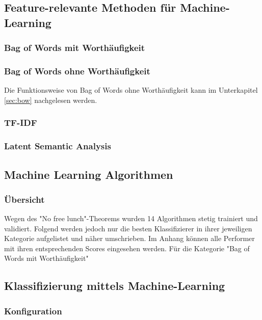 \subsection{Feature-relevante Methoden für Machine-Learning}
\subsubsection{Bag of Words mit Worthäufigkeit}
\subsubsection{Bag of Words ohne Worthäufigkeit}
Die Funktionsweise von Bag of Words ohne Worthäufigkeit kann im Unterkapitel \ref{sec:bow} nachgelesen werden.
\subsubsection{TF-IDF}
\subsubsection{Latent Semantic Analysis}
\subsection{Machine Learning Algorithmen}
\subsubsection{Übersicht}
Wegen des "No free lunch"-Theorems wurden 14 Algorithmen stetig trainiert und validiert.
Folgend werden jedoch nur die besten Klassifizierer in ihrer jeweiligen Kategorie aufgelistet und näher umschrieben.
Im Anhang können alle Performer mit ihren entsprechenden Scores eingesehen werden.
Für die Kategorie "Bag of Words mit Worthäufigkeit"
\subsection{Klassifizierung mittels Machine-Learning}
\subsubsection{Konfiguration}
\subsubsection{}
